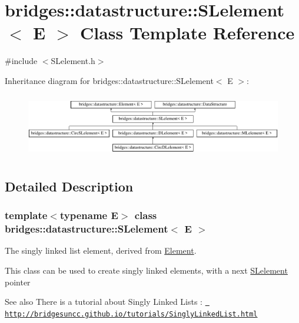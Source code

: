 \hypertarget{classbridges_1_1datastructure_1_1_s_lelement}{}\section{bridges\+::datastructure\+::S\+Lelement$<$ E $>$ Class Template Reference}
\label{classbridges_1_1datastructure_1_1_s_lelement}


{\ttfamily \#include $<$S\+Lelement.\+h$>$}

Inheritance diagram for bridges\+::datastructure\+::S\+Lelement$<$ E $>$\+:\begin{figure}[H]
\begin{center}
\leavevmode
\includegraphics[height=2.839037cm]{classbridges_1_1datastructure_1_1_s_lelement}
\end{center}
\end{figure}


\subsection{Detailed Description}
\subsubsection*{template$<$typename E$>$\newline
class bridges\+::datastructure\+::\+S\+Lelement$<$ E $>$}

The singly linked list element, derived from \mbox{\hyperlink{classbridges_1_1datastructure_1_1_element}{Element}}. 

This class can be used to create singly linked elements, with a next \mbox{\hyperlink{classbridges_1_1datastructure_1_1_s_lelement}{S\+Lelement}} pointer

\begin{DoxySeeAlso}{See also}
There is a tutorial about Singly Linked Lists \+: \href{http://bridgesuncc.github.io/tutorials/SinglyLinkedList.html}{\texttt{ http\+://bridgesuncc.\+github.\+io/tutorials/\+Singly\+Linked\+List.\+html}}
\end{DoxySeeAlso}

